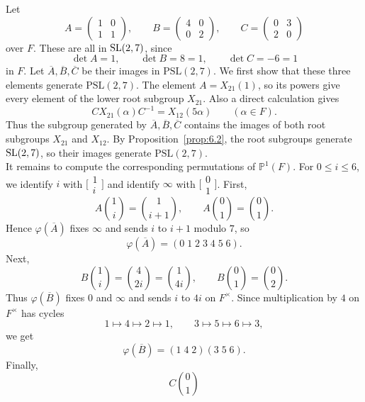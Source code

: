 \documentclass[../Odyssey_Project.tex]{subfiles}
\begin{document}
\begin{solution}
Let
\[
    A=
    \begin{pmatrix}
        1&0\\
        1&1
    \end{pmatrix},
    \qquad
    B=
    \begin{pmatrix}
        4&0\\
        0&2
    \end{pmatrix},
    \qquad
    C=
    \begin{pmatrix}
        0&3\\
        2&0
    \end{pmatrix}
\]
over $F$. These are all in $\operatorname{SL}(2,7)$, since
\[
    \det A=1,\qquad
    \det B=8=1,\qquad
    \det C=-6=1
\]
in $F$. Let $\overline A,\overline B,\overline C$ be their images in $\mathrm{PSL}(2,7)$. We first show that these three elements generate $\mathrm{PSL}(2,7)$. The element $A=X_{21}(1)$, so its powers give every element of the lower root subgroup $X_{21}$. Also a direct calculation gives
\[
    CX_{21}(\alpha)C^{-1}=X_{12}(5\alpha)
    \qquad(\alpha\in F).
\]
Thus the subgroup generated by $\overline A,\overline B,\overline C$ contains the images of both root subgroups $X_{21}$ and $X_{12}$. By Proposition~\ref{prop:6.2}, the root subgroups generate $\operatorname{SL}(2,7)$, so their images generate $\mathrm{PSL}(2,7)$.\\
It remains to compute the corresponding permutations of $\mathbb P^1(F)$. For $0\leq i\leq6$, we identify $i$ with $\bigl[\begin{smallmatrix}1\\ i\end{smallmatrix}\bigr]$ and identify $\infty$ with $\bigl[\begin{smallmatrix}0\\1\end{smallmatrix}\bigr]$. First,
\[
    A\binom{1}{i}
    =
    \binom{1}{i+1},
    \qquad
    A\binom{0}{1}
    =
    \binom{0}{1}.
\]
Hence $\varphi(\overline A)$ fixes $\infty$ and sends $i$ to $i+1$ modulo $7$, so
\[
    \varphi(\overline A)=(0\;1\;2\;3\;4\;5\;6).
\]
Next,
\[
    B\binom{1}{i}
    =
    \binom{4}{2i}
    =
    \binom{1}{4i},
    \qquad
    B\binom{0}{1}
    =
    \binom{0}{2}.
\]
Thus $\varphi(\overline B)$ fixes $0$ and $\infty$ and sends $i$ to $4i$ on $F^\times$. Since multiplication by $4$ on $F^\times$ has cycles
\[
    1\mapsto4\mapsto2\mapsto1,
    \qquad
    3\mapsto5\mapsto6\mapsto3,
\]
we get
\[
    \varphi(\overline B)=(1\;4\;2)(3\;5\;6).
\]
Finally,
\[
    C\binom{0}{1}
\]
\end{solution}
\end{document}
